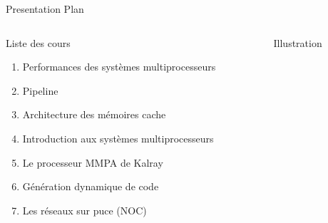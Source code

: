 %
\begin{Frame}{Presentation Plan}
  \begin{columns}[t]
    \begin{column}{5cm} %
      \begin{block}{Liste des cours}
        \begin{enumerate}
        \item  Performances des systèmes multiprocesseurs
        \item  Pipeline							
        \item  Architecture des mémoires cache	
        \item  Introduction aux systèmes multiprocesseurs
        \item  Le processeur MMPA de Kalray			
        \item  Génération dynamique de code			
        \item  Les réseaux sur puce  (NOC)
        \end{enumerate}
      \end{block} 
    \end{column}
    
    \begin{column}{5cm} %
      \begin{block}{Illustration}
      \end{block}   
    \end{column}
  \end{columns}  
\end{Frame}


